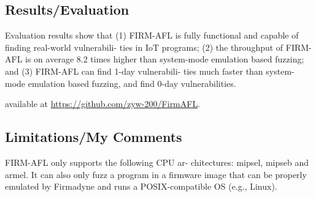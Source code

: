 \subsection{Results/Evaluation}
Evaluation results show that (1) FIRM-AFL is
fully functional and capable of finding real-world vulnerabili-
ties in IoT programs; (2) the throughput of FIRM-AFL is on
average 8.2 times higher than system-mode emulation based
fuzzing; and (3) FIRM-AFL can find 1-day vulnerabili-
ties much faster than system-mode emulation based fuzzing,
and find 0-day vulnerabilities.

available at \url{https://github.com/zyw-200/FirmAFL}.

\subsection{Limitations/My Comments}
FIRM-AFL only supports the following CPU ar-
chitectures: mipsel, mipseb and armel.
It can also only fuzz a program in a firmware image that can be properly emulated
by Firmadyne and runs a POSIX-compatible OS (e.g., Linux).
\newpage

